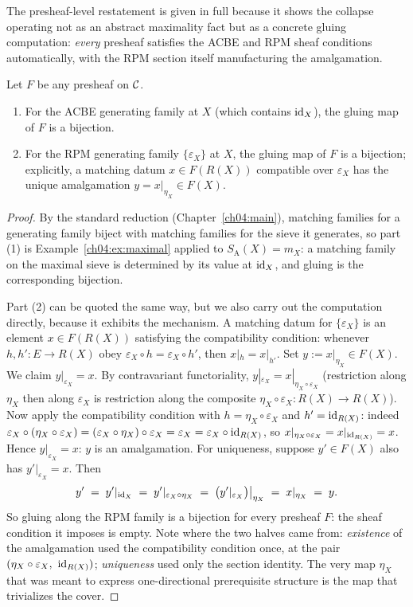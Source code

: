 The presheaf-level restatement is given in full because it shows the
collapse operating not as an abstract maximality fact but as a concrete
gluing computation: \emph{every} presheaf satisfies the ACBE and RPM sheaf
conditions automatically, with the RPM section itself manufacturing the
amalgamation.

\begin{proposition}\label{ch05:prop:autoglue}
Let $F$ be any presheaf on $\mathcal{C}$.
\begin{enumerate}
\item For the ACBE generating family at $X$ (which contains $\mathrm{id}_X$), the
gluing map of $F$ is a bijection.
\item For the RPM generating family $\{\varepsilon_X\}$ at $X$, the gluing
map of $F$ is a bijection; explicitly, a matching datum
$x\in F(R(X))$ compatible over $\varepsilon_X$ has the unique amalgamation
$y=x|_{\eta_X}\in F(X)$.
\end{enumerate}
\end{proposition}

\begin{proof}
By the standard reduction (Chapter~\ref{ch04:main}), matching families for a
generating family biject with matching families for the sieve it generates,
so part (1) is Example~\ref{ch04:ex:maximal} applied to
$S_{\mathrm{A}}(X)=m_X$: a matching family on the maximal sieve is
determined by its value at $\mathrm{id}_X$, and gluing is the corresponding
bijection.

Part (2) can be quoted the same way, but we also carry out the computation
directly, because it exhibits the mechanism. A matching datum for
$\{\varepsilon_X\}$ is an element $x\in F(R(X))$ satisfying the
compatibility condition: whenever $h,h':E\to R(X)$ obey
$\varepsilon_X\circ h=\varepsilon_X\circ h'$, then $x|_h=x|_{h'}$. Set
$y:=x|_{\eta_X}\in F(X)$. We claim $y|_{\varepsilon_X}=x$. By contravariant
functoriality, $y|_{\varepsilon_X}=x|_{\eta_X\circ\varepsilon_X}$
(restriction along $\eta_X$ then along $\varepsilon_X$ is restriction along
the composite $\eta_X\circ\varepsilon_X:R(X)\to R(X)$). Now apply the
compatibility condition with $h=\eta_X\circ\varepsilon_X$ and
$h'=\mathrm{id}_{R(X)}$: indeed
$\varepsilon_X\circ(\eta_X\circ\varepsilon_X)
=(\varepsilon_X\circ\eta_X)\circ\varepsilon_X=\varepsilon_X
=\varepsilon_X\circ\mathrm{id}_{R(X)}$,
so $x|_{\eta_X\circ\varepsilon_X}=x|_{\mathrm{id}_{R(X)}}=x$. Hence
$y|_{\varepsilon_X}=x$: $y$ is an amalgamation. For uniqueness, suppose
$y'\in F(X)$ also has $y'|_{\varepsilon_X}=x$. Then
\[
y' \;=\; y'|_{\mathrm{id}_X}
\;=\; y'|_{\varepsilon_X\circ\eta_X}
\;=\; \bigl(y'|_{\varepsilon_X}\bigr)\big|_{\eta_X}
\;=\; x|_{\eta_X} \;=\; y .
\]
So gluing along the RPM family is a bijection for every presheaf $F$: the
sheaf condition it imposes is empty. Note where the two halves came from:
\emph{existence} of the amalgamation used the compatibility condition once,
at the pair $(\eta_X\circ\varepsilon_X,\ \mathrm{id}_{R(X)})$; \emph{uniqueness}
used only the section identity. The very map $\eta_X$ that was meant to
express one-directional prerequisite structure is the map that trivializes
the cover.
\end{proof}

